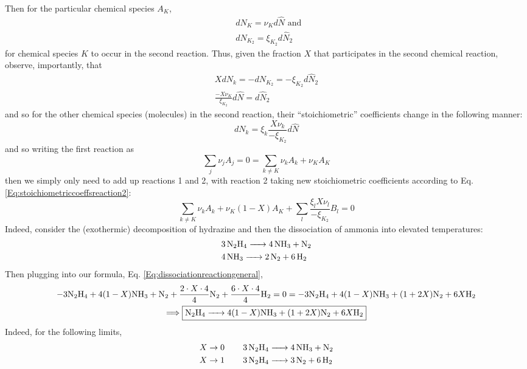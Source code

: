 \documentclass[10pt]{amsart}
\begin{document}
\begin{multicols*}{2}
Then for the particular chemical species $A_K$, \[
\begin{aligned}
  & dN_K = \nu_K d\widehat{N} \text{ and } \\
  & dN_{K_2} = \xi_{K_2} d\widehat{N}_2
\end{aligned}
\]  for chemical species $K$ to occur in the second reaction.  Thus, given the fraction $X$ that participates in the second chemical reaction, observe, importantly, that
\[
\begin{gathered}
  XdN_k = -dN_{K_2} = - \xi_{K_2} d\widehat{N}_2 \\
  \frac{-X\nu_K}{\xi_{K_2}} d\widehat{N} = d\widehat{N}_2
\end{gathered}
\]
and so for the other chemical species (molecules) in the second reaction, their ``stoichiometric'' coefficients change in the following manner:
\begin{equation}\label{Eq:stoichiometriccoeffsreaction2}
  dN_k = \xi_k \frac{X \nu_k}{-\xi_{K_2}} d\widehat{N}
\end{equation}
and so writing the first reaction as 
\[
\sum_j \nu_j A_j =0 = \sum_{k \neq K} \nu_k A_k + \nu_K A_K 
\]
then we simply only need to add up reactions 1 and 2, with reaction 2 taking new stoichiometric coefficients according to Eq. \ref{Eq:stoichiometriccoeffsreaction2}:
\begin{equation}\label{Eq:dissociationreactiongeneral}
\boxed{ \sum_{k\neq K} \nu_k A_k + \nu_K(1-X) A_K + \sum_l \frac{ \xi_l X \nu_l }{ -\xi_{K_2} } B_l = 0 }
\end{equation}
Indeed, consider the (exothermic) decomposition of hydrazine and then the dissociation of ammonia into elevated temperatures:
\[
\begin{aligned}
  &  \ce{3N2H4 -> 4NH3 + N2} \\ 
  &  \ce{4NH3 -> 2N2 + 6H2 }
\end{aligned}
\]
Then plugging into our formula, Eq. \ref{Eq:dissociationreactiongeneral}, 
\[
\begin{gathered}
  -3 \ce{N2H4} + 4(1-X) \ce{NH3} + \ce{N2} + \frac{2\cdot X\cdot 4}{4} \ce{N2} + \frac{6 \cdot X \cdot 4}{4} \ce{H2} = 0 = -3 \ce{N2H4} + 4(1-X) \ce{NH3} + (1+2X)\ce{N2} + 6X\ce{H2} \\
\Longrightarrow \boxed{ \ce{N2H4 -> } 4(1-X) \ce{NH3} + (1+2X) \ce{N2} + 6X \ce{H2} }
\end{gathered}
\]
Indeed, for the following limits, 
\[
\begin{aligned}
X \to 0  \qquad \, &  \ce{3N2H4 -> 4NH3 + N2} \\ 
 X \to 1  \qquad \, &  \ce{3N2H4 -> 3N2 + 6H2 }
\end{aligned}
\]


\end{multicols*}
\end{document}
